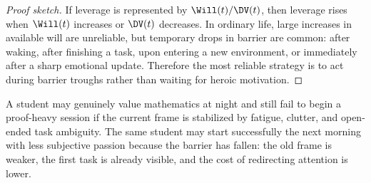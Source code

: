 \begin{proof}[Proof sketch]
If leverage is represented by $\Will(t)/\DV(t)$, then leverage rises when
$\Will(t)$ increases or $\DV(t)$ decreases. In ordinary life, large increases
in available will are unreliable, but temporary drops in barrier are common:
after waking, after finishing a task, upon entering a new environment, or
immediately after a sharp emotional update. Therefore the most reliable
strategy is to act during barrier troughs rather than waiting for heroic
motivation.
\end{proof}

\begin{example}
A student may genuinely value mathematics at night and still fail to begin a
proof-heavy session if the current frame is stabilized by fatigue, clutter,
and open-ended task ambiguity. The same student may start successfully the
next morning with less subjective passion because the barrier has fallen: the
old frame is weaker, the first task is already visible, and the cost of
redirecting attention is lower.
\end{example}
